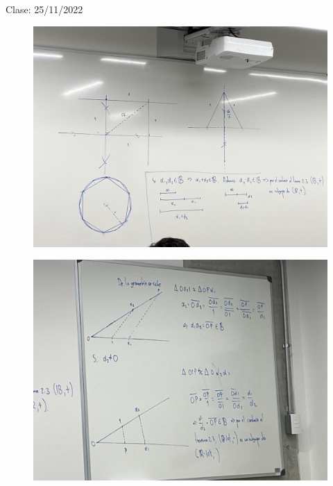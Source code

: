 Clase: 25/11/2022

\begin{figure}[H]
    \centering
    \includegraphics[scale=0.2]{imagenes/27.1.jpeg}
\end{figure}

\begin{figure}[H]
    \centering
    \includegraphics[scale=0.2]{imagenes/27.2.jpeg}
\end{figure}

